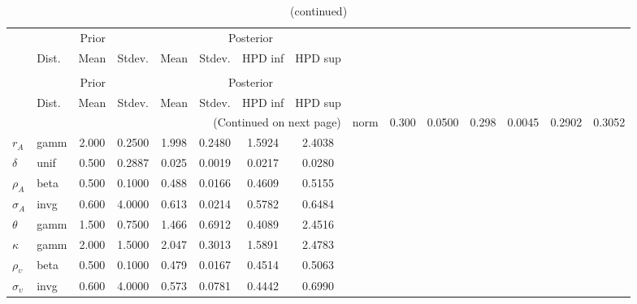  
\begin{center}
\begin{longtable}{llcccccc} 
\caption{Results from Metropolis-Hastings (parameters)}
 \label{Table:MHPosterior:1}\\
\toprule 
  & \multicolumn{3}{c}{Prior}  &  \multicolumn{4}{c}{Posterior} \\
  \cmidrule(r{.75em}){2-4} \cmidrule(r{.75em}){5-8}
  & Dist. & Mean  & Stdev. & Mean & Stdev. & HPD inf & HPD sup\\
\midrule \endfirsthead 
\caption{(continued)}\\\toprule 
  & \multicolumn{3}{c}{Prior}  &  \multicolumn{4}{c}{Posterior} \\
  \cmidrule(r{.75em}){2-4} \cmidrule(r{.75em}){5-8}
  & Dist. & Mean  & Stdev. & Mean & Stdev. & HPD inf & HPD sup\\
\midrule \endhead 
\bottomrule \multicolumn{8}{r}{(Continued on next page)} \endfoot 
\bottomrule \endlastfoot 
${\alpha}$ & norm &   0.300 & 0.0500 &   0.298& 0.0045 &  0.2902 &  0.3052 \\ 
${r_{A}}$ & gamm &   2.000 & 0.2500 &   1.998& 0.2480 &  1.5924 &  2.4038 \\ 
${\delta}$ & unif &   0.500 & 0.2887 &   0.025& 0.0019 &  0.0217 &  0.0280 \\ 
${\rho_A}$ & beta &   0.500 & 0.1000 &   0.488& 0.0166 &  0.4609 &  0.5155 \\ 
${\sigma_A}$ & invg &   0.600 & 4.0000 &   0.613& 0.0214 &  0.5782 &  0.6484 \\ 
${\theta}$ & gamm &   1.500 & 0.7500 &   1.466& 0.6912 &  0.4089 &  2.4516 \\ 
${\kappa}$ & gamm &   2.000 & 1.5000 &   2.047& 0.3013 &  1.5891 &  2.4783 \\ 
${\rho_\upsilon}$ & beta &   0.500 & 0.1000 &   0.479& 0.0167 &  0.4514 &  0.5063 \\ 
${\sigma_\upsilon}$ & invg &   0.600 & 4.0000 &   0.573& 0.0781 &  0.4442 &  0.6990 \\ 
\end{longtable}
 \end{center}
